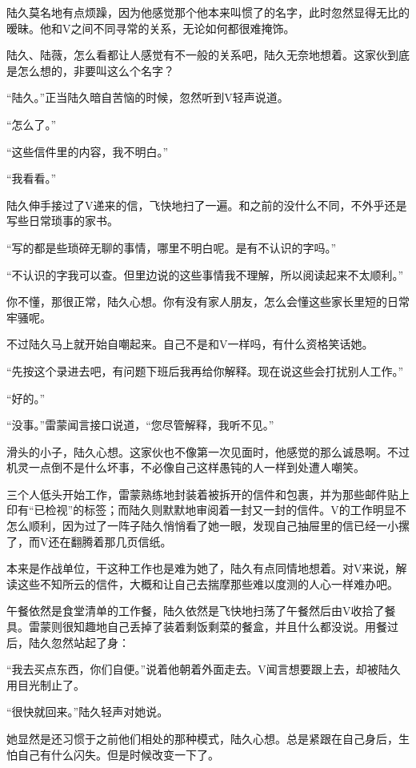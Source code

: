 陆久莫名地有点烦躁，因为他感觉那个他本来叫惯了的名字，此时忽然显得无比的暧昧。他和V之间不同寻常的关系，无论如何都很难掩饰。

陆久、陆薇，怎么看都让人感觉有不一般的关系吧，陆久无奈地想着。这家伙到底是怎么想的，非要叫这么个名字？

“陆久。”正当陆久暗自苦恼的时候，忽然听到V轻声说道。

“怎么了。”

“这些信件里的内容，我不明白。”

“我看看。”

陆久伸手接过了V递来的信，飞快地扫了一遍。和之前的没什么不同，不外乎还是写些日常琐事的家书。

“写的都是些琐碎无聊的事情，哪里不明白呢。是有不认识的字吗。”

“不认识的字我可以查。但里边说的这些事情我不理解，所以阅读起来不太顺利。”

你不懂，那很正常，陆久心想。你有没有家人朋友，怎么会懂这些家长里短的日常牢骚呢。

不过陆久马上就开始自嘲起来。自己不是和V一样吗，有什么资格笑话她。

“先按这个录进去吧，有问题下班后我再给你解释。现在说这些会打扰别人工作。”

“好的。”

“没事。”雷蒙闻言接口说道，“您尽管解释，我听不见。”

滑头的小子，陆久心想。这家伙也不像第一次见面时，他感觉的那么诚恳啊。不过机灵一点倒不是什么坏事，不必像自己这样愚钝的人一样到处遭人嘲笑。

三个人低头开始工作，雷蒙熟练地封装着被拆开的信件和包裹，并为那些邮件贴上印有“已检视”的标签；而陆久则默默地审阅着一封又一封的信件。V的工作明显不怎么顺利，因为过了一阵子陆久悄悄看了她一眼，发现自己抽屉里的信已经一小摞了，而V还在翻腾着那几页信纸。

本来是作战单位，干这种工作也是难为她了，陆久有点同情地想着。对V来说，解读这些不知所云的信件，大概和让自己去揣摩那些难以度测的人心一样难办吧。

午餐依然是食堂清单的工作餐，陆久依然是飞快地扫荡了午餐然后由V收拾了餐具。雷蒙则很知趣地自己丢掉了装着剩饭剩菜的餐盒，并且什么都没说。用餐过后，陆久忽然站起了身：

“我去买点东西，你们自便。”说着他朝着外面走去。V闻言想要跟上去，却被陆久用目光制止了。

“很快就回来。”陆久轻声对她说。

她显然是还习惯于之前他们相处的那种模式，陆久心想。总是紧跟在自己身后，生怕自己有什么闪失。但是时候改变一下了。

